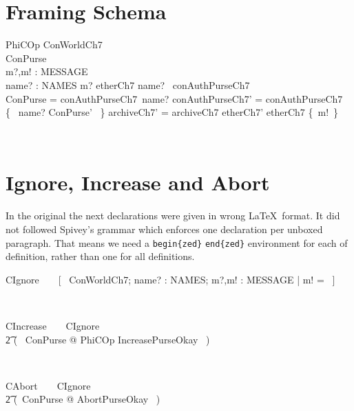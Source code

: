 \section{Framing Schema}\label{ch7.PhiCOp}

\begin{LSDef}
\begin{schema}{PhiCOp}
  \Delta ConWorldCh7
  \\      \Delta ConPurse
  \\      m?,m! : MESSAGE
  \\      name? : NAMES
  \where
  m? \in etherCh7
  \also
  name? \in \dom~conAuthPurseCh7
  \\      \theta ConPurse = conAuthPurseCh7~name?
  \also
  conAuthPurseCh7' = conAuthPurseCh7 \oplus \{~ name? \mapsto \theta ConPurse' ~\}
  \also
  archiveCh7' = archiveCh7
  \also
  etherCh7' \subseteq etherCh7 \cup \{~m!~\}
\end{schema}~\end{LSDef}

\section{Ignore, Increase and Abort}

In the original the next declarations were given in wrong \LaTeX\ format. It
did not followed Spivey's grammar which enforces one declaration per unboxed
paragraph. That means we need a \verb|begin{zed}| \verb|end{zed}| environment
for each of definition, rather than one for all definitions.
%
\begin{LSDef}
\begin{zed}
  CIgnore~~~~[~ \Xi ConWorldCh7; name? : NAMES; m?,m! : MESSAGE | m! = \bot ~]
\end{zed}~\end{LSDef}

\begin{LSDef}
\begin{zed}
  CIncrease~~~~CIgnore
  \\ \t2  \lor (~ \exists \Delta ConPurse @ PhiCOp \land IncreasePurseOkay ~)
\end{zed}~\end{LSDef}
%
\begin{LSDef}
\begin{zed}
  CAbort~~~~CIgnore
  \\ \t2          \lor (~\exists \Delta ConPurse @
  AbortPurseOkay \land [~ PhiCOp | m! = \bot ~]~)
\end{zed}~\end{LSDef}

